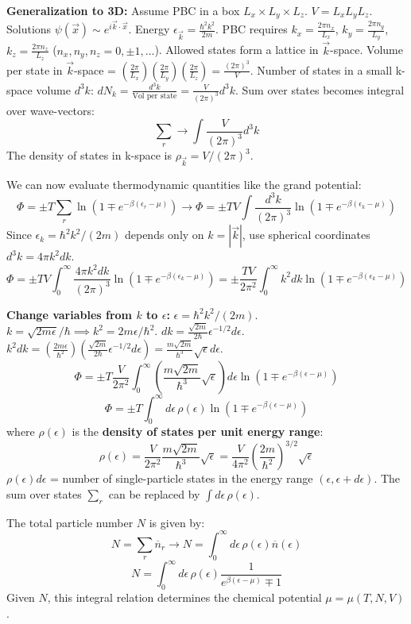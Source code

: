 \documentclass[11pt]{article}
\newcommand{\eps}{\epsilon}
\newcommand{\nbar}{\overline{n}} %
\begin{document}
\textbf{Generalization to 3D:}
Assume PBC in a box $L_x \times L_y \times L_z$. $V=L_x L_y L_z$.
Solutions $\psi(\vec{x}) \sim e^{i\vec{k}\cdot\vec{x}}$. Energy $\eps_{\vec{k}} = \frac{\hbar^2 k^2}{2m}$.
PBC requires $k_x = \frac{2\pi n_x}{L_x}$, $k_y = \frac{2\pi n_y}{L_y}$, $k_z = \frac{2\pi n_z}{L_z}$ ($n_x, n_y, n_z = 0, \pm 1, \dots$).
Allowed states form a lattice in $\vec{k}$-space.
Volume per state in $\vec{k}$-space = $(\frac{2\pi}{L_x})(\frac{2\pi}{L_y})(\frac{2\pi}{L_z}) = \frac{(2\pi)^3}{V}$.
Number of states in a small k-space volume $d^3k$: $dN_k = \frac{d^3k}{\text{Vol per state}} = \frac{V}{(2\pi)^3} d^3k$.
Sum over states becomes integral over wave-vectors:
\[ \sum_r \longrightarrow \int \frac{V}{(2\pi)^3} d^3k \]
The density of states in k-space is $\rho_{\vec{k}} = V/(2\pi)^3$.

We can now evaluate thermodynamic quantities like the grand potential:
\[ \Phi = \pm T \sum_r \ln(1 \mp e^{-\beta(\eps_r-\mu)}) \longrightarrow \Phi = \pm T V \int \frac{d^3k}{(2\pi)^3} \ln(1 \mp e^{-\beta(\eps_k-\mu)}) \]
Since $\eps_k = \hbar^2 k^2/(2m)$ depends only on $k=|\vec{k}|$, use spherical coordinates $d^3k = 4\pi k^2 dk$.
\[ \Phi = \pm T V \int_0^\infty \frac{4\pi k^2 dk}{(2\pi)^3} \ln(1 \mp e^{-\beta(\eps_k-\mu)}) = \pm \frac{TV}{2\pi^2} \int_0^\infty k^2 dk \ln(1 \mp e^{-\beta(\eps_k-\mu)}) \]

\textbf{Change variables from $k$ to $\epsilon$:} $\eps = \hbar^2 k^2/(2m)$.
$k = \sqrt{2m\eps}/\hbar \implies k^2 = 2m\eps/\hbar^2$.
$dk = \frac{\sqrt{2m}}{2\hbar} \eps^{-1/2} d\eps$.
$k^2 dk = (\frac{2m\eps}{\hbar^2}) (\frac{\sqrt{2m}}{2\hbar} \eps^{-1/2} d\eps) = \frac{m\sqrt{2m}}{\hbar^3} \sqrt{\eps} d\eps$.
\[ \Phi = \pm T \frac{V}{2\pi^2} \int_0^\infty \left( \frac{m\sqrt{2m}}{\hbar^3} \sqrt{\eps} \right) d\eps \ln(1 \mp e^{-\beta(\eps-\mu)}) \]
\[ \Phi = \pm T \int_0^\infty d\eps \, \rho(\eps) \ln(1 \mp e^{-\beta(\eps-\mu)}) \]
where $\rho(\eps)$ is the \textbf{density of states per unit energy range}:
\[ \rho(\eps) = \frac{V}{2\pi^2} \frac{m\sqrt{2m}}{\hbar^3} \sqrt{\eps} = \frac{V}{4\pi^2} \left( \frac{2m}{\hbar^2} \right)^{3/2} \sqrt{\eps} \]
$\rho(\eps) d\eps$ = number of single-particle states in the energy range $(\eps, \eps+d\eps)$.
The sum over states $\sum_r$ can be replaced by $\int d\eps \, \rho(\eps)$.

The total particle number $N$ is given by:
\[ N = \sum_r \nbar_r \longrightarrow N = \int_0^\infty d\eps \, \rho(\eps) \nbar(\eps) \]
\[ N = \int_0^\infty d\eps \, \rho(\eps) \frac{1}{e^{\beta(\eps-\mu)} \mp 1} \]
Given $N$, this integral relation determines the chemical potential $\mu = \mu(T, N, V)$.
\end{document}
